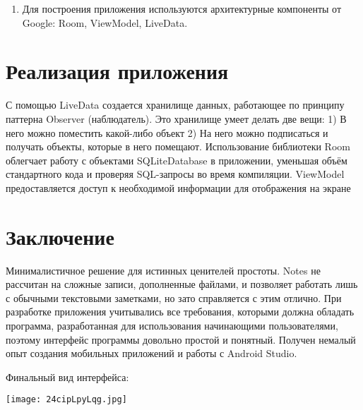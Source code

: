 \documentclass[a4paper,12pt]{article}
\begin{document}
\begin{enumerate}
    \item Для построения приложения используются архитектурные компоненты от Google: Room, ViewModel, LiveData.
   
\end{enumerate}


\newpage
\section{Реализация приложения}

С помощью LiveData создается хранилище данных, работающее по принципу паттерна Observer (наблюдатель). Это хранилище умеет делать две вещи:
1) В него можно поместить какой-либо объект
2) На него можно подписаться и получать объекты, которые в него помещают.
Использование библиотеки Room облегчает работу с объектами SQLiteDatabase в приложении, уменьшая объём стандартного кода и проверяя SQL-запросы во время компиляции.
ViewModel предоставляется доступ к необходимой информации для отображения на экране



\newpage
\section*{Заключение}
Минималистичное решение для истинных ценителей простоты. Notes не рассчитан на сложные записи, дополненные файлами, и позволяет работать лишь с обычными текстовыми заметками, но зато справляется с этим отлично. При разработке приложения учитывались все требования, которыми должна обладать программа, разработанная для использования начинающими пользователями, поэтому интерфейс программы довольно простой и понятный. Получен немалый опыт создания мобильных приложений и работы с Android Studio. 

Финальный вид интерфейса:
\begin{center}
    \texttt{[image: 24cipLpyLqg.jpg]}
\end{center}

\end{document}
